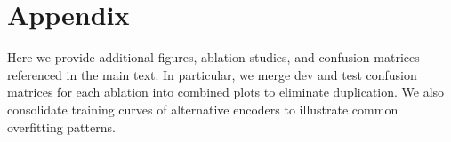 \documentclass[11pt]{article}
\begin{document}



\clearpage

\appendix
\section*{Appendix}
Here we provide additional figures, ablation studies, and confusion matrices referenced in the main text. In particular, we merge dev and test confusion matrices for each ablation into combined plots to eliminate duplication. We also consolidate training curves of alternative encoders to illustrate common overfitting patterns.
\end{document}
